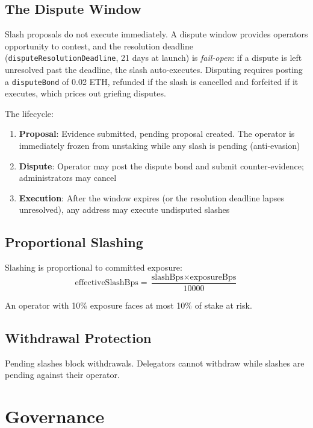 \documentclass[11pt,a4paper]{article}
\begin{document}
\subsection{The Dispute Window}

Slash proposals do not execute immediately. A dispute window provides operators opportunity to contest, and the resolution deadline (\texttt{disputeResolutionDeadline}, 21 days at launch) is \emph{fail-open}: if a dispute is left unresolved past the deadline, the slash auto-executes. Disputing requires posting a \texttt{disputeBond} of 0.02 ETH, refunded if the slash is cancelled and forfeited if it executes, which prices out griefing disputes.

The lifecycle:
\begin{enumerate}[noitemsep]
    \item \textbf{Proposal}: Evidence submitted, pending proposal created. The operator is immediately frozen from unstaking while any slash is pending (anti-evasion)
    \item \textbf{Dispute}: Operator may post the dispute bond and submit counter-evidence; administrators may cancel
    \item \textbf{Execution}: After the window expires (or the resolution deadline lapses unresolved), any address may execute undisputed slashes
\end{enumerate}

\subsection{Proportional Slashing}

Slashing is proportional to committed exposure:
\[
\text{effectiveSlashBps} = \frac{\text{slashBps} \times \text{exposureBps}}{10000}
\]

An operator with 10\% exposure faces at most 10\% of stake at risk.

\subsection{Withdrawal Protection}

Pending slashes block withdrawals. Delegators cannot withdraw while slashes are pending against their operator.

\section{Governance}
\end{document}
